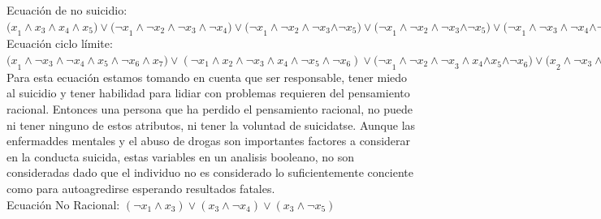 {{{{{Ecuación de no suicidio:
${ (x }_{ 1 }\wedge { x }_{ 3 }\wedge { x }_{ 4 }\wedge { x }_{ 5 })\vee { (\neg x }_{ 1 }\wedge { \neg x }_{ 2 }\wedge { \neg x }_{ 3 }\wedge { \neg x }_{ 4 })\vee { (\neg x }_{ 1 }\wedge { \neg x }_{ 2 }\wedge { \neg x }_{ 3 }{ \wedge \neg x }_{ 5 })\vee { (\neg x }_{ 1 }\wedge { \neg x }_{ 2 }\wedge { \neg x }_{ 3 }{ \wedge \neg x }_{ 5 })\vee { (\neg x }_{ 1 }\wedge { \neg x }_{ 3 }\wedge { \neg x }_{ 4 }{ \wedge \neg x }_{ 5 })\vee { (\neg x }_{ 2 }\wedge { \neg x }_{ 3 }\wedge { \neg x }_{ 4 }{ \wedge \neg x }_{ 5 })\vee { (\neg x }_{ 2 }\wedge { \neg x }_{ 3 }\wedge { \neg x }_{ 4 }{ \wedge \neg x }_{ 6 }{ \wedge \neg x }_{ 7 })\vee { (\neg x }_{ 2 }\wedge { \neg x }_{ 3 }\wedge { \neg x }_{ 5 }{ \wedge \neg x }_{ 6 })\vee { (\neg x }_{ 2 }\wedge { \neg x }_{ 3 }\wedge { \neg x }_{ 5 }{ \wedge \neg x }_{ 7 })\vee { (\neg x }_{ 3 }\wedge { \neg x }_{ 4 }\wedge { \neg x }_{ 5 }{ \wedge \neg x }_{ 6 })$\\


Ecuación ciclo límite:
${ (x }_{ 1 }\wedge { \neg x }_{ 3 }\wedge { \neg x }_{ 4 }\wedge { x }_{ 5 }\wedge { \neg x }_{ 6 }\wedge { x }_{ 7 })\vee({ \neg x }_{ 1 }\wedge { x }_{ 2 }\wedge { \neg x }_{ 3 }\wedge { x }_{ 4 }\wedge { \neg x }_{ 5 }\wedge { \neg x }_{ 6 })\vee { (\neg x }_{ 1 }\wedge { { \neg x }_{ 2 }\wedge \neg x }_{ 3 }\wedge { x }_{ 4 }{ \wedge x }_{ 5 }{ \wedge \neg x }_{ 6 })\vee { (x }_{ 2 }\wedge { { \neg x }_{ 3 }\wedge x }_{ 4 }\wedge { \neg x }_{ 5 }{ \wedge \neg x }_{ 6 }{ \wedge \neg x }_{ 7 })\vee { (x }_{ 2 }\wedge { { \neg x }_{ 3 }\wedge \neg x }_{ 4 }\wedge { x }_{ 5 }{ \wedge \neg x }_{ 6 })\vee { (\neg x }_{ 2 }\wedge { { \neg x }_{ 3 }\wedge x }_{ 4 }\wedge { x }_{ 5 }{ \wedge \neg x }_{ 6 }{ \wedge \neg x }_{ 7 })$\\

Para esta ecuación estamos tomando en cuenta que ser responsable, tener miedo al suicidio y tener habilidad para lidiar con problemas requieren del pensamiento racional. Entonces una persona que ha perdido el pensamiento racional, no puede ni tener ninguno de estos atributos, ni tener la voluntad de suicidatse. Aunque las enfermaddes mentales y el abuso de drogas son importantes factores a considerar en la conducta suicida, estas variables en un analisis booleano, no son consideradas dado que el individuo no es considerado lo suficientemente conciente como para autoagredirse esperando resultados fatales.\\

Ecuación No Racional:
$ ( \neg x_1 \wedge x_3) \vee (x_3\wedge \neg x_4) \vee (x_3 \wedge \neg x_5) $\\

}}}}}
